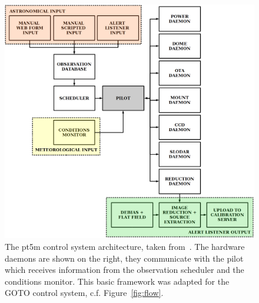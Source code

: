 \begin{colsection}
\begin{colsection}
\begin{figure}[p]
\begin{center}
\includegraphics[width=\linewidth]{images/pt5m_software.png}
\end{center}
\caption[\gls{pt5m} control system architecture]{The \gls{pt5m} control system architecture, taken from~\cite{pt5m}. The hardware daemons are shown on the right, they communicate with the pilot which receives information from the observation scheduler and the conditions monitor. This basic framework was adapted for the GOTO control system, c.f. Figure~\ref{fig:flow}.}
\label{fig:pt5m_software}
\end{figure}

\end{colsection}


\end{colsection}


\newpage
